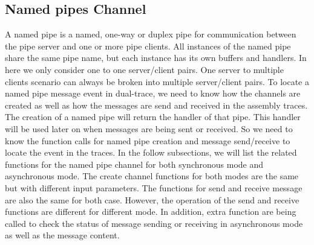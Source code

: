 \documentclass[paper=a4, fontsize=11pt]{scrartcl}
\numberwithin{equation}{section}		%
\numberwithin{figure}{section}			%
\numberwithin{table}{section}				%
\begin{document}
\subsection{Named pipes Channel}
A named pipe is a named, one-way or duplex pipe for communication between the pipe server and one or more pipe clients. All instances of the named pipe share the same pipe name, but each instance has its own buffers and handlers. In here we only consider one to one server/client pairs. One server to multiple clients scenario can always be broken into multiple server/client pairs. To locate a named pipe message event in dual-trace, we need to know how the channels are created as well as how the messages are send and received in the assembly traces. The creation of a named pipe will return the handler of that pipe. This handler will be used later on when messages are being sent or received. So we need to know the function calls for named pipe creation and message send/receive to locate the event in the traces. In the follow subsections, we will list the related functions for the named pipe channel for both synchronous mode and asynchronous mode. The create channel functions for both modes are the same but with different input parameters. The functions for send and receive message are also the same for both case. However, the operation of the send and receive functions are different for different mode. In addition, extra function are being called to check the status of message sending or receiving in asynchronous mode as well as the message content.
\end{document}
